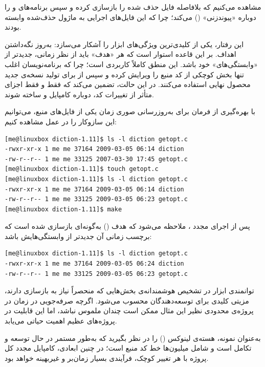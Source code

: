 مشاهده می‌کنیم که  بلافاصله فایل حذف شده را بازسازی کرده و سپس برنامه‌های  و  را دوباره «پیوندزنی» () می‌کند؛ چرا که این فایل‌های اجرایی به ماژول حذف‌شده وابسته بودند.

این رفتار، یکی از کلیدی‌ترین ویژگی‌های ابزار  را آشکار می‌سازد: به‌روز نگه‌داشتن اهداف.  بر این قاعده استوار است که هر «هدف» باید از نظر زمانی، جدیدتر از «وابستگی‌های» خود باشد. این منطق کاملاً کاربردی است؛ چرا که برنامه‌نویسان اغلب تنها بخش کوچکی از کد منبع را ویرایش کرده و سپس از  برای تولید نسخه‌ی جدید محصول نهایی استفاده می‌کنند. در این حالت،  تضمین می‌کند که فقط و فقط اجزای متأثر از تغییرات کد، دوباره کامپایل و ساخته شوند.

با بهره‌گیری از فرمان  برای به‌روزرسانی صوری زمان یکی از فایل‌های منبع، می‌توانیم این سازوکار را در عمل مشاهده کنیم:

\begin{latin}
\begin{lstlisting}
[me@linuxbox diction-1.11]$ ls -l diction getopt.c
-rwxr-xr-x 1 me me 37164 2009-03-05 06:14 diction
-rw-r--r-- 1 me me 33125 2007-03-30 17:45 getopt.c
[me@linuxbox diction-1.11]$ touch getopt.c
[me@linuxbox diction-1.11]$ ls -l diction getopt.c
-rwxr-xr-x 1 me me 37164 2009-03-05 06:14 diction
-rw-r--r-- 1 me me 33125 2009-03-05 06:23 getopt.c
[me@linuxbox diction-1.11]$ make
\end{lstlisting}
\end{latin}

پس از اجرای مجدد ، ملاحظه می‌شود که هدف () به‌گونه‌ای بازسازی شده است که برچسب زمانی آن جدیدتر از وابستگی‌هایش باشد:

\begin{latin}
\begin{lstlisting}
[me@linuxbox diction-1.11]$ ls -l diction getopt.c
-rwxr-xr-x 1 me me 37164 2009-03-05 06:24 diction
-rw-r--r-- 1 me me 33125 2009-03-05 06:23 getopt.c
\end{lstlisting}
\end{latin}

توانمندی ابزار  در تشخیص هوشمندانه‌ی بخش‌هایی که منحصراً نیاز به بازسازی دارند، مزیتی کلیدی برای توسعه‌دهندگان محسوب می‌شود. اگرچه صرفه‌جویی در زمان در پروژه‌ی محدودی نظیر این مثال ممکن است چندان ملموس نباشد، اما این قابلیت در پروژه‌های عظیم اهمیت حیاتی می‌یابد.

به‌عنوان نمونه، هسته‌ی لینوکس () را در نظر بگیرید که به‌طور مستمر در حال توسعه و تکامل است و شامل میلیون‌ها خط کد منبع است؛ در چنین ابعادی، کامپایل مجدد کل پروژه با هر تغییر کوچک، فرآیندی بسیار زمان‌بر و غیربهینه خواهد بود.

